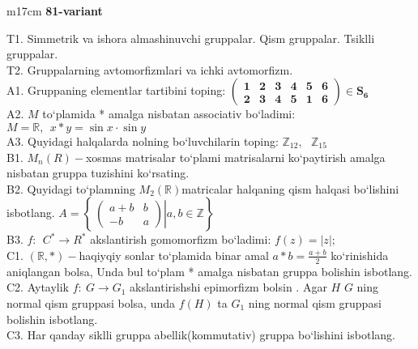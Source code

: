 \documentclass{article}
\begin{document}
\begin{tabular}{m{17cm}}
\textbf{81-variant}
\newline

T1. Simmetrik va ishora almashinuvchi gruppalar. Qism gruppalar. Tsiklli gruppalar. \\
T2. Gruppalarning avtomorfizmlari va ichki avtomorfizm. \\
A1. Gruppaning elementlar tartibini toping: \(\begin{pmatrix}
\mathbf{1} & \mathbf{2} & \mathbf{3} & \mathbf{4} & \mathbf{5} & \mathbf{6} \\
\mathbf{2} & \mathbf{3} & \mathbf{4} & \mathbf{5} & \mathbf{1} & \mathbf{6}
\end{pmatrix}\mathbf{\in}\mathbf{S}_{\mathbf{6}}\) \\
A2. \(M\) to`plamida * amalga nisbatan associativ bo`ladimi: \(M\mathbb{= R},\ \ x*y = \sin x \cdot \sin y\) \\
A3. Quyidagi halqalarda nolning bo`luvchilarin toping: \(\mathbb{Z}_{12},\ \ \ \mathbb{Z}_{15}\) \\
B1. \(M_{n}(R) -\)xosmas matrisalar to`plami matrisalarni ko`paytirish amalga nisbatan gruppa tuzishini ko`rsating. \\
B2. Quyidagi to`plamning \(M_{2}(\mathbb{R})\)matricalar halqaning qism halqasi bo`lishini isbotlang. \(A = \left\{ \left. \ \begin{pmatrix}
a + b & b \\
 - b & a
\end{pmatrix} \right|a,b\mathbb{\in Z} \right\}\) \\
B3. \(f:\ \ C^{*} \rightarrow R^{*}\) akslantirish gomomorfizm bo`ladimi: \(f(z) = |z|;\) \\
C1. \((\mathbb{R},*) -\)haqiyqiy sonlar to`plamida binar amal \(a*b = \frac{a + b}{2}\) ko`rinishida aniqlangan bolsa, Unda bul to`plam * amalga nisbatan gruppa bolishin isbotlang. \\
C2. Aytaylik \(f:\ G \rightarrow G_{1}\) akslantirishshi epimorfizm bo\textquotesingle lsin . Agar \(H\) \(G\) ning normal qism gruppasi bolsa, unda \(f(H)\) ta \(G_{1}\) ning normal qism gruppasi bolishin isbotlang. \\
C3. Har qanday siklli gruppa abellik(kommutativ) gruppa bo`lishini isbotlang. \\

\end{tabular}
\vspace{1cm}
\end{document}
